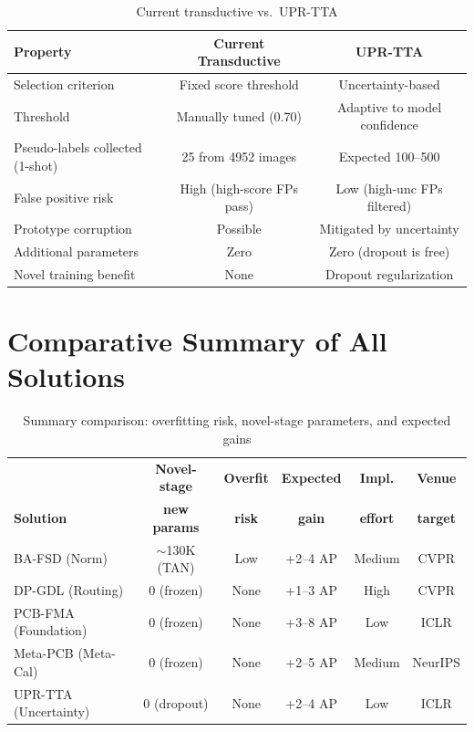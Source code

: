 \documentclass[11pt,a4paper]{article}
\begin{document}
\begin{table}[h]
\centering
\caption{Current transductive vs.\ UPR-TTA}
\small
\begin{tabular}{lcc}
\toprule
\textbf{Property} & \textbf{Current Transductive} & \textbf{UPR-TTA} \\
\midrule
Selection criterion & Fixed score threshold & Uncertainty-based \\
Threshold & Manually tuned (0.70) & Adaptive to model confidence \\
Pseudo-labels collected (1-shot) & 25 from 4952 images & Expected 100--500 \\
False positive risk & High (high-score FPs pass) & Low (high-unc FPs filtered) \\
Prototype corruption & Possible & Mitigated by uncertainty \\
Additional parameters & Zero & Zero (dropout is free) \\
Novel training benefit & None & Dropout regularization \\
\bottomrule
\end{tabular}
\end{table}


\section{Comparative Summary of All Solutions}

\begin{table}[h!]
\centering
\caption{Summary comparison: overfitting risk, novel-stage parameters, and expected gains}
\small
\begin{tabular}{lccccc}
\toprule
& \textbf{Novel-stage} & \textbf{Overfit} & \textbf{Expected} & \textbf{Impl.} & \textbf{Venue} \\
\textbf{Solution} & \textbf{new params} & \textbf{risk} & \textbf{gain} & \textbf{effort} & \textbf{target} \\
\midrule
BA-FSD (Norm) & $\sim$130K (TAN) & Low & +2--4 AP & Medium & CVPR \\
DP-GDL (Routing) & 0 (frozen) & None & +1--3 AP & High & CVPR \\
PCB-FMA (Foundation) & 0 (frozen) & None & +3--8 AP & Low & ICLR \\
Meta-PCB (Meta-Cal) & 0 (frozen) & None & +2--5 AP & Medium & NeurIPS \\
UPR-TTA (Uncertainty) & 0 (dropout) & None & +2--4 AP & Low & ICLR \\
\bottomrule
\end{tabular}
\end{table}
\end{document}
